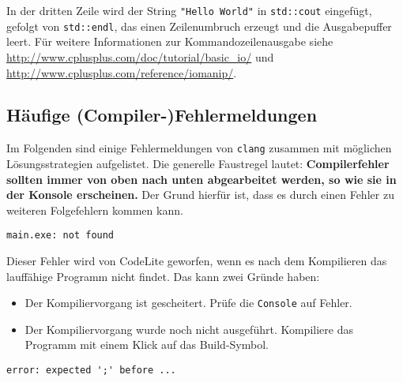 In der dritten Zeile wird der String \lstinline{"Hello World"} in \lstinline{std::cout} eingefügt, gefolgt von \lstinline{std::endl}, das einen Zeilenumbruch erzeugt und die Ausgabepuffer leert. Für weitere Informationen zur Kommandozeilenausgabe siehe \url{http://www.cplusplus.com/doc/tutorial/basic_io/} und \url{http://www.cplusplus.com/reference/iomanip/}.


\subsection*{Häufige (Compiler-)Fehlermeldungen}

Im Folgenden sind einige Fehlermeldungen von \texttt{clang} zusammen mit möglichen Lösungsstrategien aufgelistet.
Die generelle Faustregel lautet: 
\textbf{Compilerfehler sollten immer von oben nach unten abgearbeitet werden, so wie sie in der Konsole erscheinen.}
Der Grund hierfür ist, dass es durch einen Fehler zu weiteren Folgefehlern kommen kann.

\setlength{\leftskip}{1cm}

\begin{verbatim}
main.exe: not found
\end{verbatim}

Dieser Fehler wird von CodeLite geworfen, wenn es nach dem Kompilieren das lauffähige Programm nicht findet.
Das kann zwei Gründe haben:
\begin{itemize}
\item Der Kompiliervorgang ist gescheitert. Prüfe die \texttt{Console} auf Fehler.
\item Der Kompiliervorgang wurde noch nicht ausgeführt. Kompiliere das Programm mit einem Klick auf das Build-Symbol.
\end{itemize}


\begin{verbatim}
error: expected ';' before ...
\end{verbatim}

